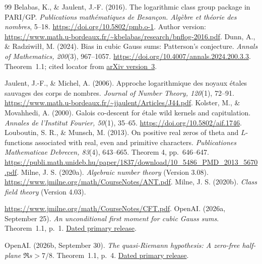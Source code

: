 \documentclass[11pt]{article}
\theoremstyle{remark}\newtheorem{remark}[theorem]{Remark}
\begin{document}
\begin{thebibliography}{99}
Belabas, K., \& Jaulent, J.-F. (2016). The logarithmic class group package in PARI/GP.
\emph{Publications math\'ematiques de Besan\c con. Alg\`ebre et th\'eorie des nombres}, 5--18.
\url{https://doi.org/10.5802/pmb.o-1}.
Author version: \url{https://www.math.u-bordeaux.fr/~kbelabas/research/bnflog-2016.pdf}.
Dunn, A., \& Radziwi\l\l, M. (2024). Bias in cubic Gauss sums: Patterson's conjecture. \emph{Annals of Mathematics, 200}(3), 967--1057. \url{https://doi.org/10.4007/annals.2024.200.3.3}. Theorem~1.1; cited locator from \href{https://arxiv.org/abs/2109.07463v3}{arXiv version~3}.

Jaulent, J.-F., \& Michel, A. (2006). Approche logarithmique des noyaux \'etales sauvages des corps de nombres.
\emph{Journal of Number Theory, 120}(1), 72--91.
\url{https://www.math.u-bordeaux.fr/~jjaulent/Articles/J44.pdf}.
Kolster, M., \& Movahhedi, A. (2000). Galois co-descent for \'etale wild kernels and capitulation.
\emph{Annales de l'Institut Fourier, 50}(1), 35--65.
\url{https://doi.org/10.5802/aif.1746}.
Louboutin, S. R., \& Munsch, M. (2013).
On positive real zeros of theta and $L$-functions associated with real, even and primitive characters.
\emph{Publicationes Mathematicae Debrecen, 83}(4), 643--665.
Theorem 4, pp.~646--647.
\url{https://publi.math.unideb.hu/paper/1837/download/10_5486_PMD_2013_5670.pdf}.
Milne, J. S. (2020a). \emph{Algebraic number theory} (Version 3.08).
\url{https://www.jmilne.org/math/CourseNotes/ANT.pdf}.
Milne, J. S. (2020b). \emph{Class field theory} (Version 4.03).
\par\noindent\url{https://www.jmilne.org/math/CourseNotes/CFT.pdf}.
OpenAI. (2026a, September 25). \emph{An unconditional first moment for cubic Gauss sums}. Theorem~1.1, p.~1. \href{https://github.com/openai/math/blob/main/preprints/An-unconditional-first-moment-for-cubic-Gauss-sums-September-25-2026/paper.pdf}{Dated primary release}.

OpenAI. (2026b, September 30). \emph{The quasi-Riemann hypothesis: A zero-free half-plane $\Re s>7/8$}. Theorem~1.1, p.~4. \href{https://github.com/openai/math/blob/main/preprints/The-Quasi-Riemann-Hypothesis-September-30-2026/paper.pdf}{Dated primary release}.


\end{thebibliography}
\end{document}
